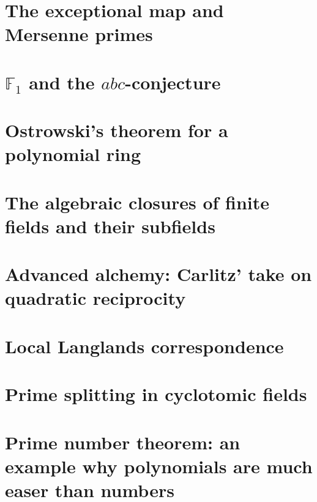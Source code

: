 \documentclass[a4paper]{memoir}
\begin{document}
\section{The exceptional map and Mersenne primes}

\section{$\mathbb{F}_1$ and the $abc$-conjecture}

\section{Ostrowski's theorem for a polynomial ring}

\section{The algebraic closures of finite fields and their subfields}

\section{Advanced alchemy: Carlitz' take on quadratic reciprocity}

\section{Local Langlands correspondence}

\section{Prime splitting in cyclotomic fields}

\section{Prime number theorem: an example why polynomials are much easer than numbers}



\end{document}
